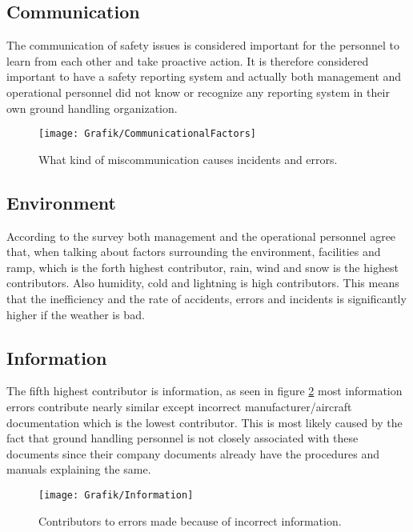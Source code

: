 \subsection{Communication}
The communication of safety issues is considered important for the personnel to learn from each other and take proactive action. It is therefore considered important to have a safety reporting system and actually both management and operational personnel did not know or recognize any reporting system in their own ground handling organization.

\begin{figure}[H]
\centering
\texttt{[image: Grafik/CommunicationalFactors]}
\caption{What kind of miscommunication causes incidents and errors.}
\label{CommunicationalFactors}
\end{figure}

\subsection{Environment}
According to the survey both management and the operational personnel agree that, when talking about factors surrounding the environment, facilities and ramp, which is the forth highest contributor, rain, wind and snow is the highest contributors. Also humidity, cold and lightning is high contributors. This means that the inefficiency and the rate of accidents, errors and incidents is significantly higher if the weather is bad.

\subsection{Information} %
The fifth highest contributor is information, as seen in figure \ref{Information} most information errors contribute nearly similar except  incorrect manufacturer/aircraft documentation which is the lowest contributor. This is most likely caused by the fact that ground handling personnel is not closely associated with these documents since their company documents already have the procedures and manuals explaining the same.

\begin{figure}[H]
\centering
\texttt{[image: Grafik/Information]}
\caption{Contributors to errors made because of incorrect information.}
\label{Information}
\end{figure}

